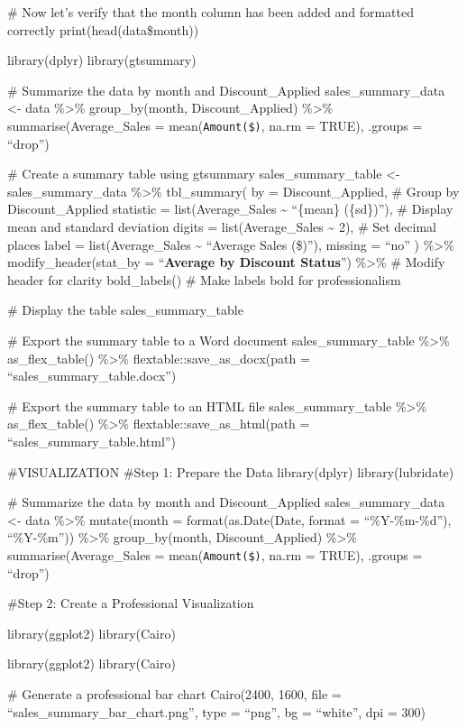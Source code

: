 \documentclass[
]{article}
\begin{document}
\# Now let's verify that the month column has been added and formatted
correctly print(head(data\$month))

library(dplyr) library(gtsummary)

\# Summarize the data by month and Discount\_Applied
sales\_summary\_data \textless- data \%\textgreater\% group\_by(month,
Discount\_Applied) \%\textgreater\% summarise(Average\_Sales =
mean(\texttt{Amount(\$)}, na.rm = TRUE), .groups = ``drop'')

\# Create a summary table using gtsummary sales\_summary\_table
\textless- sales\_summary\_data \%\textgreater\% tbl\_summary( by =
Discount\_Applied, \# Group by Discount\_Applied statistic =
list(Average\_Sales \textasciitilde{} ``\{mean\} (\{sd\})''), \# Display
mean and standard deviation digits = list(Average\_Sales
\textasciitilde{} 2), \# Set decimal places label = list(Average\_Sales
\textasciitilde{} ``Average Sales (\$)''), missing = ``no'' )
\%\textgreater\% modify\_header(stat\_by = ``\textbf{Average by Discount
Status}'') \%\textgreater\% \# Modify header for clarity bold\_labels()
\# Make labels bold for professionalism

\# Display the table sales\_summary\_table

\# Export the summary table to a Word document sales\_summary\_table
\%\textgreater\% as\_flex\_table() \%\textgreater\%
flextable::save\_as\_docx(path = ``sales\_summary\_table.docx'')

\# Export the summary table to an HTML file sales\_summary\_table
\%\textgreater\% as\_flex\_table() \%\textgreater\%
flextable::save\_as\_html(path = ``sales\_summary\_table.html'')

\#VISUALIZATION \#Step 1: Prepare the Data library(dplyr)
library(lubridate)

\# Summarize the data by month and Discount\_Applied
sales\_summary\_data \textless- data \%\textgreater\% mutate(month =
format(as.Date(Date, format = ``\%Y-\%m-\%d''), ``\%Y-\%m''))
\%\textgreater\% group\_by(month, Discount\_Applied) \%\textgreater\%
summarise(Average\_Sales = mean(\texttt{Amount(\$)}, na.rm = TRUE),
.groups = ``drop'')

\#Step 2: Create a Professional Visualization

library(ggplot2) library(Cairo)

library(ggplot2) library(Cairo)

\# Generate a professional bar chart Cairo(2400, 1600, file =
``sales\_summary\_bar\_chart.png'', type = ``png'', bg = ``white'', dpi
= 300)
\end{document}
